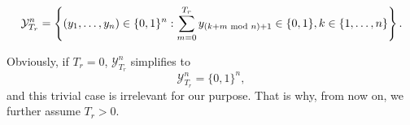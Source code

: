 \documentclass{article}
\begin{document}
    
    \begin{equation}
        \mathcal{Y}_{T_r}^n = \left\{ (y_1, \dots, y_n) \in \{0, 1\}^n : \sum_{m=0}^{T_r} y_{(k+m \textnormal{ mod } n) + 1} \in \{0, 1\}, k \in \{1, \dots, n\} \right\}.
    \end{equation}
    
    Obviously, if $T_r = 0$, $\mathcal{Y}_{T_r}^n$ simplifies to 
    \begin{equation}
      \mathcal{Y}_{T_r}^n = \{0, 1\}^n,
    \end{equation}
    and this trivial case is irrelevant for our purpose. That is why, from now on, we further assume $T_r > 0$.

    
    
    
\end{document}
